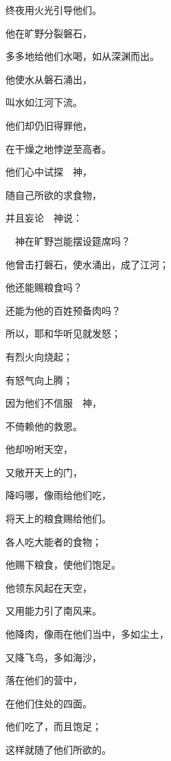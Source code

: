{\par }{\Q 终夜用火光引导他们。
\par }{\Q {}他在旷野分裂磐石，
\par }{\Q 多多地给他们水喝，如从深渊而出。
\par }{\Q {}他使水从磐石涌出，
\par }{\Q 叫水如江河下流。
\par }{\BB \par }{\Q {}他们却仍旧得罪他，
\par }{\Q 在干燥之地悖逆至高者。
\par }{\Q {}他们心中试探　神，
\par }{\Q 随自己所欲的求食物，
\par }{\Q {}并且妄论　神说：
\par }{\Q 　神在旷野岂能摆设筵席吗？
\par }{\Q {}他曾击打磐石，使水涌出，成了江河；
\par }{\Q 他还能赐粮食吗？
\par }{\Q 还能为他的百姓预备肉吗？
\par }{\BB \par }{\Q {}所以，耶和华听见就发怒；
\par }{\Q 有烈火向{}烧起；
\par }{\Q 有怒气向{}上腾；
\par }{\Q {}因为他们不信服　神，
\par }{\Q 不倚赖他的救恩。
\par }{\Q {}他却吩咐天空，
\par }{\Q 又敞开天上的门，
\par }{\Q {}降吗哪，像雨给他们吃，
\par }{\Q 将天上的粮食赐给他们。
\par }{\Q {}各人吃大能者的食物；
\par }{\Q 他赐下粮食，使他们饱足。
\par }{\Q {}他领东风起在天空，
\par }{\Q 又用能力引了南风来。
\par }{\Q {}他降肉，像雨在他们当中，多如尘土，
\par }{\Q 又降飞鸟，多如海沙，
\par }{\Q {}落在他们的营中，
\par }{\Q 在他们住处的四面。
\par }{\Q {}他们吃了，而且饱足；
\par }{\Q 这样就随了他们所欲的。
}
